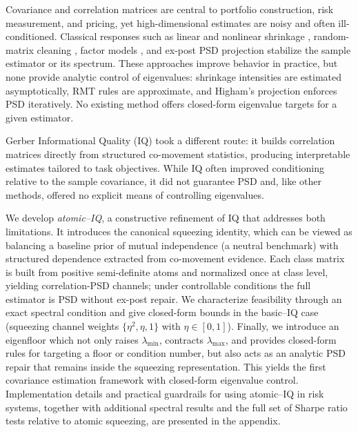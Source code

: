 \documentclass[12pt,letterpaper]{article}
\begin{document}
Covariance and correlation matrices are central to portfolio construction, risk measurement, and pricing, yet high-dimensional estimates are noisy and often ill-conditioned. Classical responses such as linear and nonlinear shrinkage \citep{ledoit2004honey,ledoit2004well,ledoit2017,ledoit2022quadratic}, random-matrix cleaning \citep{laloux1999,bun2017cleaning}, factor models \citep{chamberlain1983factor,fan2013factor}, and ex-post PSD projection \citep{higham2002computing} stabilize the sample estimator or its spectrum. These approaches improve behavior in practice, but none provide analytic control of eigenvalues: shrinkage intensities are estimated asymptotically, RMT rules are approximate, and Higham’s projection enforces PSD iteratively. No existing method offers closed-form eigenvalue targets for a given estimator.

Gerber Informational Quality (IQ) took a different route: it builds correlation matrices directly from structured co-movement statistics, producing interpretable estimates tailored to task objectives. While IQ often improved conditioning relative to the sample covariance, it did not guarantee PSD and, like other methods, offered no explicit means of controlling eigenvalues.

We develop \emph{atomic--IQ}, a constructive refinement of IQ that addresses both limitations. It introduces the canonical squeezing identity, which can be viewed as balancing a baseline prior of mutual independence (a neutral benchmark) with structured dependence extracted from co-movement evidence. Each class matrix is built from positive semi-definite atoms and normalized once at class level, yielding correlation-PSD channels; under controllable conditions the full estimator is PSD without ex-post repair. We characterize feasibility through an exact spectral condition and give closed-form bounds in the basic--IQ case (squeezing channel weights $\{\eta^2,\eta,1\}$ with $\eta\in[0,1]$). Finally, we introduce an eigenfloor which not only raises $\lambda_{\min}$, contracts $\lambda_{\max}$, and provides closed-form rules for targeting a floor or condition number, but also acts as an analytic PSD repair that remains inside the squeezing representation. This yields the first covariance estimation framework with closed-form eigenvalue control. Implementation details and practical guardrails for using atomic–IQ in risk systems, together with additional spectral results and the full set of Sharpe ratio tests relative to atomic squeezing, are presented in the appendix.
\end{document}
